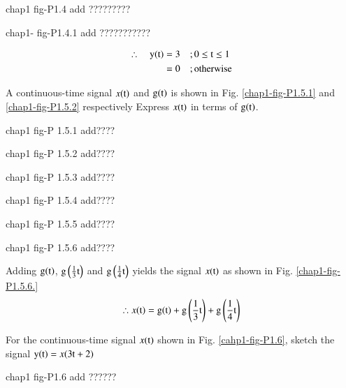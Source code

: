 \begin{center}
chap1 fig-P1.4 add ????????? 
\end{center}


\begin{solution}
\begin{center}
chap1- fig-P1.4.1 add ???????????
\end{center}

\begin{align*}
\therefore \quad \textrm{y}(\textrm{t}) &=3 \quad; 0 \leq \textrm{t} \leq 1\\
                            &=0  \quad; \text{otherwise}
\end{align*}
\end{solution}

\begin{example}
A continuous-time signal $x(\textrm{t})$ and $\textrm{g}(\textrm{t})$ is shown in Fig. \ref{chap1-fig-P1.5.1} and \ref{chap1-fig-P1.5.2} respectively Express $x(\textrm{t})$ in terms of $\textrm{g}(\textrm{t})$.
\begin{center}
chap1 fig-P 1.5.1 add????
\end{center}
\begin{center}
chap1 fig-P 1.5.2 add????
\end{center}
\end{example}

\begin{solution}
\begin{center}
chap1 fig-P 1.5.3 add????
\end{center}

\begin{center}
chap1 fig-P 1.5.4 add????
\end{center}

\begin{center}
chap1 fig-P 1.5.5 add????
\end{center}

\begin{center}
chap1 fig-P 1.5.6 add????
\end{center}

Adding $\textrm{g}(\textrm{t})$, $\textrm{g} \left( \frac{1}{3} \textrm{t}\right)$ and $\textrm{g}\left(\frac{1}{4} \textrm{t}\right)$ yields the signal $x(\textrm{t})$ as shown in Fig. \ref{chap1-fig-P1.5.6.}
$$
\therefore x(\textrm{t}) = \textrm{g}(\textrm{t}) + \textrm{g} \left(\frac{1}{3} \textrm{t} \right) + \textrm{g} \left(\frac{1}{4} \textrm{t} \right)
$$
\end{solution}

\begin{example}\label{chap1-example-1.6}
For the continuous-time signal $x(\textrm{t})$ shown in Fig. \ref{cahp1-fig-P1.6}, sketch the signal $\textrm{y}(\textrm{t})= x(3 \textrm{t} + 2)$
\begin{center}
chap1 fig-P1.6 add ??????
\end{center}
\end{example}


